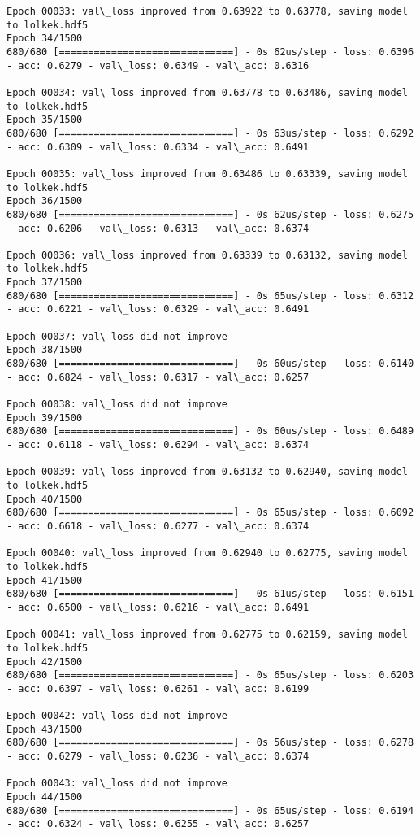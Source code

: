 \documentclass[11pt]{article}
\begin{document}
\begin{Verbatim}[commandchars=\\\{\}]
Epoch 00033: val\_loss improved from 0.63922 to 0.63778, saving model to lolkek.hdf5
Epoch 34/1500
680/680 [==============================] - 0s 62us/step - loss: 0.6396 - acc: 0.6279 - val\_loss: 0.6349 - val\_acc: 0.6316

Epoch 00034: val\_loss improved from 0.63778 to 0.63486, saving model to lolkek.hdf5
Epoch 35/1500
680/680 [==============================] - 0s 63us/step - loss: 0.6292 - acc: 0.6309 - val\_loss: 0.6334 - val\_acc: 0.6491

Epoch 00035: val\_loss improved from 0.63486 to 0.63339, saving model to lolkek.hdf5
Epoch 36/1500
680/680 [==============================] - 0s 62us/step - loss: 0.6275 - acc: 0.6206 - val\_loss: 0.6313 - val\_acc: 0.6374

Epoch 00036: val\_loss improved from 0.63339 to 0.63132, saving model to lolkek.hdf5
Epoch 37/1500
680/680 [==============================] - 0s 65us/step - loss: 0.6312 - acc: 0.6221 - val\_loss: 0.6329 - val\_acc: 0.6491

Epoch 00037: val\_loss did not improve
Epoch 38/1500
680/680 [==============================] - 0s 60us/step - loss: 0.6140 - acc: 0.6824 - val\_loss: 0.6317 - val\_acc: 0.6257

Epoch 00038: val\_loss did not improve
Epoch 39/1500
680/680 [==============================] - 0s 60us/step - loss: 0.6489 - acc: 0.6118 - val\_loss: 0.6294 - val\_acc: 0.6374

Epoch 00039: val\_loss improved from 0.63132 to 0.62940, saving model to lolkek.hdf5
Epoch 40/1500
680/680 [==============================] - 0s 65us/step - loss: 0.6092 - acc: 0.6618 - val\_loss: 0.6277 - val\_acc: 0.6374

Epoch 00040: val\_loss improved from 0.62940 to 0.62775, saving model to lolkek.hdf5
Epoch 41/1500
680/680 [==============================] - 0s 61us/step - loss: 0.6151 - acc: 0.6500 - val\_loss: 0.6216 - val\_acc: 0.6491

Epoch 00041: val\_loss improved from 0.62775 to 0.62159, saving model to lolkek.hdf5
Epoch 42/1500
680/680 [==============================] - 0s 65us/step - loss: 0.6203 - acc: 0.6397 - val\_loss: 0.6261 - val\_acc: 0.6199

Epoch 00042: val\_loss did not improve
Epoch 43/1500
680/680 [==============================] - 0s 56us/step - loss: 0.6278 - acc: 0.6279 - val\_loss: 0.6236 - val\_acc: 0.6374

Epoch 00043: val\_loss did not improve
Epoch 44/1500
680/680 [==============================] - 0s 65us/step - loss: 0.6194 - acc: 0.6324 - val\_loss: 0.6255 - val\_acc: 0.6257


\end{Verbatim}
\end{document}
